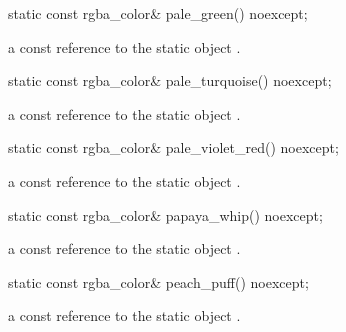 \begin{itemdecl}
    static const rgba_color& pale_green() noexcept;
\end{itemdecl}
\begin{itemdescr}
    \pnum
    \returns
    a const reference to the static  object .
\end{itemdescr}

\begin{itemdecl}
    static const rgba_color& pale_turquoise() noexcept;
\end{itemdecl}
\begin{itemdescr}
    \pnum
    \returns
    a const reference to the static  object .
\end{itemdescr}

\begin{itemdecl}
    static const rgba_color& pale_violet_red() noexcept;
\end{itemdecl}
\begin{itemdescr}
    \pnum
    \returns
    a const reference to the static  object .
\end{itemdescr}

\begin{itemdecl}
    static const rgba_color& papaya_whip() noexcept;
\end{itemdecl}
\begin{itemdescr}
    \pnum
    \returns
    a const reference to the static  object .
\end{itemdescr}

\begin{itemdecl}
    static const rgba_color& peach_puff() noexcept;
\end{itemdecl}
\begin{itemdescr}
    \pnum
    \returns
    a const reference to the static  object .
\end{itemdescr}

